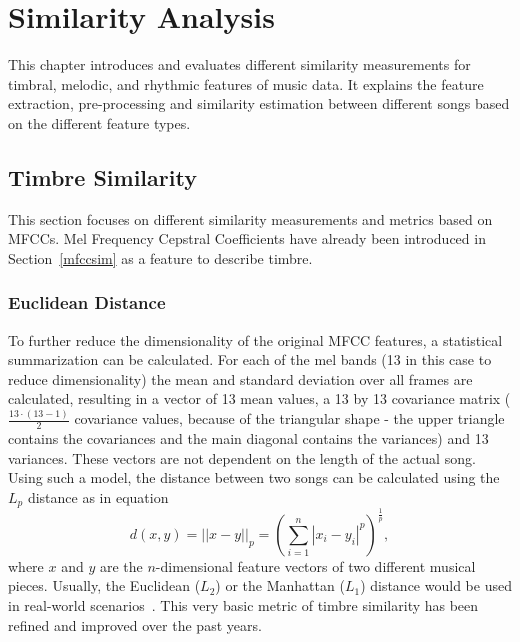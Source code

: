 
\chapter{Similarity Analysis}\label{simanal}


This chapter introduces and evaluates different similarity measurements for timbral, melodic, and rhythmic features of music data. It explains the feature extraction, pre-processing and similarity estimation between different songs based on the different feature types. 

\section{Timbre Similarity} \label{musly}

This section focuses on different similarity measurements and metrics based on MFCCs. Mel Frequency Cepstral Coefficients have already been introduced in Section~\ref{mfccsim} as a feature to describe timbre.\\

\subsection{Euclidean Distance}\label{mfcceuc}

To further reduce the dimensionality of the original MFCC features, a statistical summarization can be calculated. For each of the mel bands (13 in this case to reduce dimensionality) the mean and standard deviation over all frames are calculated, resulting in a vector of 13 mean values, a 13 by 13 covariance matrix ($\frac{13\cdot(13-1)}{2}$ covariance values, because of the triangular shape - the upper triangle contains the covariances and the main diagonal contains the variances) and 13 variances. These vectors are not dependent on the length of the actual song.~\cite[pp. 51ff]{knees1}\\
Using such a model, the distance between two songs can be calculated using the $L_p$ distance as in equation
\begin{equation} \label{eq:distGmm}
d(x, y) = ||x - y||_p = \left(\sum_{i=1}^{n}{|x_i - y_i|^p}\right)^{\frac{1}{p}},
\end{equation} 
where $x$ and $y$ are the $n$-dimensional feature vectors of two different musical pieces.
Usually, the Euclidean ($L_2$) or the Manhattan ($L_1$) distance would be used in real-world scenarios~\cite[p. 58]{knees1}. This very basic metric of timbre similarity has been refined and improved over the past years.

